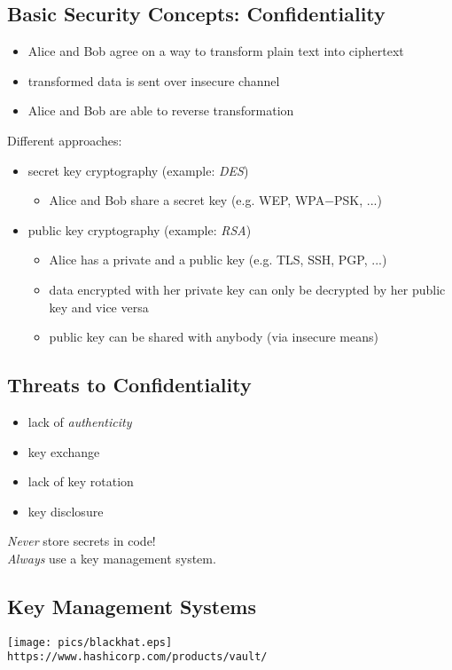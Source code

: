 \documentclass[xga]{xdvislides}
\begin{document}
\subsection{Basic Security Concepts: Confidentiality}
\begin{itemize}
	\item Alice and Bob agree on a way to transform plain text into ciphertext
	\item transformed data is sent over insecure channel
	\item Alice and Bob are able to reverse transformation
\end{itemize}
\addvspace{.5in}
Different approaches:
\begin{itemize}
	\item secret key cryptography (example: {\em DES})
		\begin{itemize}
			\item Alice and Bob share a secret key (e.g. WEP, WPA−PSK, ...)
		\end{itemize}
\end{itemize}
\addvspace{.25in}
\begin{itemize}
	\item public key cryptography (example: {\em RSA})
		\begin{itemize}
			\item Alice has a private and a public key (e.g. TLS, SSH, PGP, ...)
			\item data encrypted with her private key can only be decrypted by
				her public key and vice versa
			\item public key can be shared with anybody (via insecure means)
		\end{itemize}
\end{itemize}

\subsection{Threats to Confidentiality}
\begin{itemize}
	\item lack of {\em authenticity}
	\item key exchange
	\item lack of key rotation
	\item key disclosure
\end{itemize}
\addvspace{.5in}
{\em Never} store secrets in code! \\
{\em Always} use a key management system.

\subsection{Key Management Systems}
\vspace*{\fill}
\begin{center}
	\texttt{[image: pics/blackhat.eps]} \\
	\vspace{.25in}
	\verb+https://www.hashicorp.com/products/vault/+
\end{center}
\vspace*{\fill}
\end{document}
